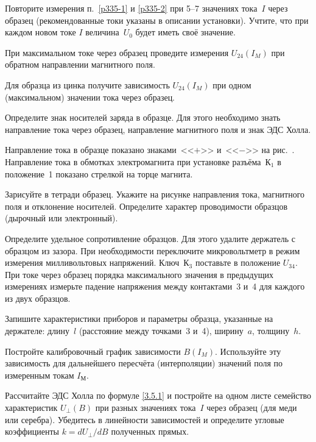 \begin{lab:task}
\item Повторите измерения п.~\ref{p335-1} и \ref{p335-2} при 5--7 значениях тока~$I$ через образец
(рекомендованные токи указаны в описании установки).  
Учтите, что при каждом новом токе $I$ величина~$U_0$ будет иметь 
своё значение.

\item При максимальном токе через образец проведите измерения $U_{24}(I_{M})$ 
при обратном направлении магнитного поля.

\item Для образца из цинка получите зависимость $U_{24}(I_{M})$ при одном 
(максимальном) значении тока через образец.

\item Определите знак носителей заряда в образце. Для этого необходимо знать
направление тока через образец, направление магнитного поля и знак ЭДС Холла.

Направление тока в образце показано знаками~<<$+$>> и~<<$-$>> на
рис.~. Направление тока в обмотках электромагнита при 
установке разъёма~К$_1$ в положение~1 показано стрелкой на торце магнита.

Зарисуйте в тетради образец. Укажите на рисунке направления тока, магнитного
поля и отклонение носителей. Определите характер проводимости образцов
(дырочный или электронный).

\item Определите удельное сопротивление образцов. Для этого удалите держатель с
образцом из зазора. При необходимости переключите микровольтметр 
в режим измерения милливольтовых напряжений. Ключ~К$_3$ поставьте 
в положение $U_{34}$. При токе через образец порядка максимального 
значения в предыдущих измерениях измерьте падение напряжения между 
контактами~3 и~4 для каждого из двух образцов.

\item Запишите характеристики приборов и параметры образца, указанные на держателе:
длину~$l$ (расстояние между точками~3 и~4), ширину~$a$, толщину~$h$.


\item Постройте калибровочный график зависимости $B(I_{M})$. 
Используйте эту зависимость для дальнейшего пересчёта (интерполяции)
значений поля по измеренным токам $I_{М}$.

\item Рассчитайте ЭДС Холла по формуле \eqref{3.5.1} и постройте на одном листе
семейство характеристик $U_{\perp}(B)$ при разных значениях тока~$I$ через
образец (для меди или серебра). 
Убедитесь в линейности зависимостей и определите угловые 
коэффициенты $k=dU_{\perp}/dB$ полученных прямых.


\end{lab:task}
